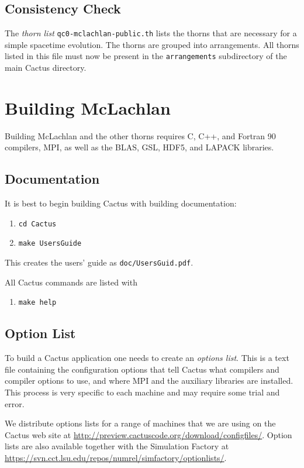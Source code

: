 \documentclass[11pt, tightenlines]{revtex4}
\newcommand{\code}[1]{\texttt{#1}}
\begin{document}
\subsection{Consistency Check}

The \emph{thorn list} \code{qc0-mclachlan-public.th} lists the thorns
that are necessary for a simple spacetime evolution.  The thorns are
grouped into arrangements.  All thorns listed in this file must now be
present in the \code{arrangements} subdirectory of the main Cactus
directory.



\section{Building McLachlan}

Building McLachlan and the other thorns requires C, C++, and Fortran
90 compilers, MPI, as well as the BLAS, GSL, HDF5, and LAPACK
libraries.

\subsection{Documentation}

It is best to begin building Cactus with building documentation:
\begin{enumerate}
\item\verb+cd Cactus+
\item\verb+make UsersGuide+
\end{enumerate}
This creates the users' guide as \code{doc/UsersGuid.pdf}.

All Cactus commands are listed with
\begin{enumerate}
\item\verb+make help+
\end{enumerate}

\subsection{Option List}

To build a Cactus application one needs to create an \emph{options
  list}.  This is a text file containing the configuration options
that tell Cactus what compilers and compiler options to use, and where
MPI and the auxiliary libraries are installed.  This process is very
specific to each machine and may require some trial and error.

We distribute options lists for a range of machines that we are using
on the Cactus web site at
\url{http://preview.cactuscode.org/download/configfiles/}.  Option
lists are also available together with the Simulation Factory
\cite{ES-simfactoryweb} at
\url{https://svn.cct.lsu.edu/repos/numrel/simfactory/optionlists/}.
\end{document}
